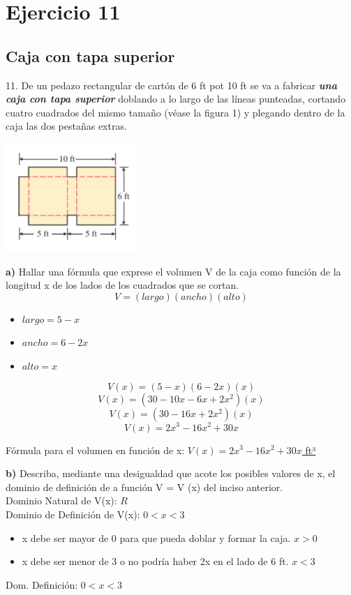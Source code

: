 \chapter*{Ejercicio 11}
\section*{Caja con tapa superior}

11. De un pedazo rectangular de cartón de 6 ft pot 10 ft se va a fabricar \textbf{\textit{una caja con tapa superior}} doblando a lo largo de las líneas punteadas, cortando cuatro cuadrados del mismo tamaño (véase la figura 1) y plegando dentro de la caja las dos pestañas extras.
\newline
\begin{center}
     \includegraphics[width=5cm]{recursos/Caja_doc_tarea.png}\par
\end{center}

\textbf{a)} Hallar una fórmula que exprese el volumen V de la caja como función de la longitud x de los lados de los cuadrados que se cortan.\\
\[
V = (largo)(ancho)(alto)
\]
\begin{itemize}
        \item $largo = 5 -x$
        \item $ancho = 6 -2x$
        \item $alto = x$
    \end{itemize}
\[
V(x) = (5-x)(6-2x)(x)
\]
\[
V(x) = (30-10x-6x+2x^{2})(x)
\]
\[
V(x) = (30-16x+2x^{2})(x)
\]
\[
V(x) = 2x^{3}-16x^{2}+30x 
\]
\begin{center}
    Fórmula para el volumen en función de x: \underline{ $V(x) = 2x^{3}-16x^{2}+30x $ ft³} 
\end{center} 

\textbf{b)} Describa, mediante una desigualdad que acote los posibles valores de x, el dominio de definición de a función V = V (x) del inciso anterior. \\
\newline
Dominio Natural de V(x): $R$ \\
Dominio de Definición de V(x): $0 < x < 3$
\begin{itemize}
    \item x debe ser mayor de 0 para que pueda doblar y formar la caja. $x > 0$
    \item x debe ser menor de 3 o no podría haber 2x en el lado de 6 ft. $x < 3$
\end{itemize}
\begin{center}
    Dom. Definición: \underline{$0 < x < 3$}
\end{center}



